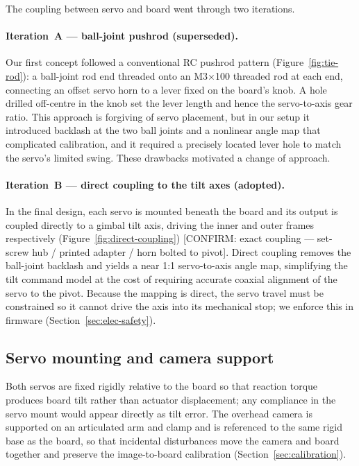 The coupling between servo and board went through two iterations.

\paragraph{Iteration~A --- ball-joint pushrod (superseded).}
Our first concept followed a conventional RC pushrod pattern
(Figure~\ref{fig:tie-rod}): a ball-joint rod end threaded onto an M3$\times$100
threaded rod at each end, connecting an offset servo horn to a lever fixed on
the board's knob. A hole drilled off-centre in the knob set the lever length
and hence the servo-to-axis gear ratio. This approach is forgiving of servo
placement, but in our setup it introduced backlash at the two ball joints and a
nonlinear angle map that complicated calibration, and it required a precisely
located lever hole to match the servo's limited swing. These drawbacks
motivated a change of approach.

\paragraph{Iteration~B --- direct coupling to the tilt axes (adopted).}
In the final design, each servo is mounted beneath the board and its output is
coupled directly to a gimbal tilt axis, driving the inner and outer frames
respectively (Figure~\ref{fig:direct-coupling}) [CONFIRM: exact coupling ---
set-screw hub / printed adapter / horn bolted to pivot]. Direct coupling
removes the ball-joint backlash and yields a near 1:1 servo-to-axis angle map,
simplifying the tilt command model at the cost of requiring accurate coaxial
alignment of the servo to the pivot. Because the mapping is direct, the servo
travel must be constrained so it cannot drive the axis into its mechanical
stop; we enforce this in firmware (Section~\ref{sec:elec-safety}).

\subsection{Servo mounting and camera support}
\label{sec:mech-mount}

Both servos are fixed rigidly relative to the board so that reaction torque
produces board tilt rather than actuator displacement; any compliance in the
servo mount would appear directly as tilt error. The overhead camera is
supported on an articulated arm and clamp and is referenced to the same rigid
base as the board, so that incidental disturbances move the camera and board
together and preserve the image-to-board calibration
(Section~\ref{sec:calibration}).

